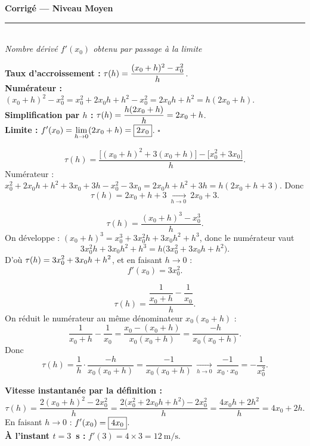 \pagestyle{fancy}\fancyhf{}
\fancyfoot[C]{\small\thepage}
\renewcommand{\headrulewidth}{0.8pt}



\begin{center}
{\LARGE\bfseries\color{primarydark} Corrigé — Niveau Moyen}\\[2pt]
{\color{primary}\rule{0.5\textwidth}{1.2pt}}\\[4pt]
{\small\itshape Nombre dérivé $f'(x_0)$ obtenu par passage à la limite}
\end{center}
\vspace{2mm}

\begin{corr}[1 --- $f(x)=x^2$, montrer $f'(x_0)=2x_0$]
\textbf{Taux d'accroissement :}
$\displaystyle \tau(h)=\frac{(x_0+h)^2-x_0^2}{h}$.\\[2pt]
\textbf{Numérateur :} $(x_0+h)^2-x_0^2=x_0^2+2x_0h+h^2-x_0^2=2x_0h+h^2=h(2x_0+h)$.\\[2pt]
\textbf{Simplification par $h$ :} $\displaystyle \tau(h)=\frac{h(2x_0+h)}{h}=2x_0+h$.\\[2pt]
\textbf{Limite :} $\displaystyle f'(x_0)=\lim_{h\to 0}(2x_0+h)=\boxed{2x_0}$. \hfill$\square$
\end{corr}

\begin{corr}[2 --- $f(x)=x^2+3x$]
\[
\tau(h)=\frac{\big[(x_0+h)^2+3(x_0+h)\big]-\big[x_0^2+3x_0\big]}{h}.
\]
Numérateur : $x_0^2+2x_0h+h^2+3x_0+3h-x_0^2-3x_0=2x_0h+h^2+3h=h(2x_0+h+3)$. Donc
\[
\tau(h)=2x_0+h+3\ \xrightarrow[h\to 0]{}\ \boxed{2x_0+3}.
\]
\end{corr}

\begin{corr}[3 --- $f(x)=x^3$]
\[
\tau(h)=\frac{(x_0+h)^3-x_0^3}{h}.
\]
On développe : $(x_0+h)^3=x_0^3+3x_0^2h+3x_0h^2+h^3$, donc le numérateur vaut
\[
3x_0^2h+3x_0h^2+h^3=h\big(3x_0^2+3x_0h+h^2\big).
\]
D'où $\displaystyle \tau(h)=3x_0^2+3x_0h+h^2$, et en faisant $h\to 0$ :
\[
f'(x_0)=\boxed{3x_0^2}.
\]
\end{corr}

\begin{corr}[4 --- $f(x)=\tfrac{1}{x}$, $x_0\neq 0$]
\[
\tau(h)=\frac{\dfrac{1}{x_0+h}-\dfrac{1}{x_0}}{h}.
\]
On réduit le numérateur au même dénominateur $x_0(x_0+h)$ :
\[
\frac{1}{x_0+h}-\frac{1}{x_0}=\frac{x_0-(x_0+h)}{x_0(x_0+h)}=\frac{-h}{x_0(x_0+h)}.
\]
Donc
\[
\tau(h)=\frac{1}{h}\cdot\frac{-h}{x_0(x_0+h)}=\frac{-1}{x_0(x_0+h)}
\ \xrightarrow[h\to 0]{}\ \frac{-1}{x_0\cdot x_0}=\boxed{-\frac{1}{x_0^{2}}}.
\]
\end{corr}

\begin{corr}[5 --- mobile MRUA, $y=f(x)=2x^2$]
\textbf{Vitesse instantanée par la définition :}
\[
\tau(h)=\frac{2(x_0+h)^2-2x_0^2}{h}
=\frac{2\big(x_0^2+2x_0h+h^2\big)-2x_0^2}{h}
=\frac{4x_0h+2h^2}{h}=4x_0+2h.
\]
En faisant $h\to 0$ : $\displaystyle f'(x_0)=\boxed{4x_0}$.\\[3pt]
\textbf{À l'instant $t=3$~s :} $f'(3)=4\times 3=\boxed{12\ \text{m/s}}$.
\end{corr}


